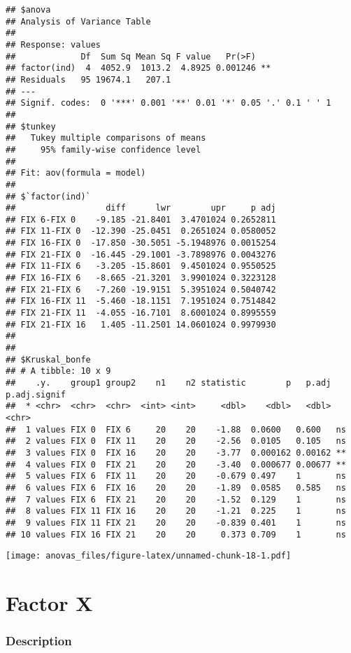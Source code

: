 \documentclass[
]{article}
\begin{document}
\begin{verbatim}
## $anova
## Analysis of Variance Table
## 
## Response: values
##             Df  Sum Sq Mean Sq F value   Pr(>F)   
## factor(ind)  4  4052.9  1013.2  4.8925 0.001246 **
## Residuals   95 19674.1   207.1                    
## ---
## Signif. codes:  0 '***' 0.001 '**' 0.01 '*' 0.05 '.' 0.1 ' ' 1
## 
## $tunkey
##   Tukey multiple comparisons of means
##     95% family-wise confidence level
## 
## Fit: aov(formula = model)
## 
## $`factor(ind)`
##                  diff      lwr        upr     p adj
## FIX 6-FIX 0    -9.185 -21.8401  3.4701024 0.2652811
## FIX 11-FIX 0  -12.390 -25.0451  0.2651024 0.0580052
## FIX 16-FIX 0  -17.850 -30.5051 -5.1948976 0.0015254
## FIX 21-FIX 0  -16.445 -29.1001 -3.7898976 0.0043276
## FIX 11-FIX 6   -3.205 -15.8601  9.4501024 0.9550525
## FIX 16-FIX 6   -8.665 -21.3201  3.9901024 0.3223128
## FIX 21-FIX 6   -7.260 -19.9151  5.3951024 0.5040742
## FIX 16-FIX 11  -5.460 -18.1151  7.1951024 0.7514842
## FIX 21-FIX 11  -4.055 -16.7101  8.6001024 0.8995559
## FIX 21-FIX 16   1.405 -11.2501 14.0601024 0.9979930
## 
## 
## $Kruskal_bonfe
## # A tibble: 10 x 9
##    .y.    group1 group2    n1    n2 statistic        p   p.adj p.adj.signif
##  * <chr>  <chr>  <chr>  <int> <int>     <dbl>    <dbl>   <dbl> <chr>       
##  1 values FIX 0  FIX 6     20    20    -1.88  0.0600   0.600   ns          
##  2 values FIX 0  FIX 11    20    20    -2.56  0.0105   0.105   ns          
##  3 values FIX 0  FIX 16    20    20    -3.77  0.000162 0.00162 **          
##  4 values FIX 0  FIX 21    20    20    -3.40  0.000677 0.00677 **          
##  5 values FIX 6  FIX 11    20    20    -0.679 0.497    1       ns          
##  6 values FIX 6  FIX 16    20    20    -1.89  0.0585   0.585   ns          
##  7 values FIX 6  FIX 21    20    20    -1.52  0.129    1       ns          
##  8 values FIX 11 FIX 16    20    20    -1.21  0.225    1       ns          
##  9 values FIX 11 FIX 21    20    20    -0.839 0.401    1       ns          
## 10 values FIX 16 FIX 21    20    20     0.373 0.709    1       ns
\end{verbatim}

\texttt{[image: anovas\_files/figure-latex/unnamed-chunk-18-1.pdf]}

\hypertarget{factor-x}{%
\section{Factor X}\label{factor-x}}

\hypertarget{description-9}{%
\subsubsection{Description}\label{description-9}}
\end{document}
